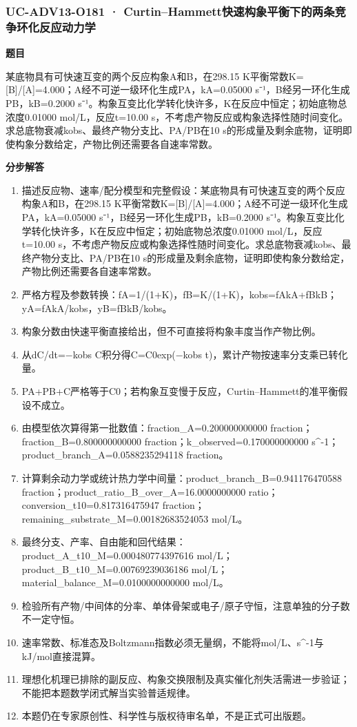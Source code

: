 \documentclass[UTF8,11pt,a4paper]{ctexart}
\begin{document}
\subsubsection*{UC-ADV13-O181 · Curtin–Hammett快速构象平衡下的两条竞争环化反应动力学}
\noindent\textbf{题目}\par
某底物具有可快速互变的两个反应构象A和B，在298.15 K平衡常数K=[B]/[A]=4.000；A经不可逆一级环化生成PA，kA=0.05000 s⁻¹，B经另一环化生成PB，kB=0.2000 s⁻¹。构象互变比化学转化快许多，K在反应中恒定；初始底物总浓度0.01000 mol/L，反应t=10.00 s，不考虑产物反应或构象选择性随时间变化。求总底物衰减kobs、最终产物分支比、PA/PB在10 s的形成量及剩余底物，证明即使构象分数给定，产物比例还需要各自速率常数。\par
\medskip\noindent\textbf{分步解答}
\begin{enumerate}
\item 描述反应物、速率/配分模型和完整假设：某底物具有可快速互变的两个反应构象A和B，在298.15 K平衡常数K=[B]/[A]=4.000；A经不可逆一级环化生成PA，kA=0.05000 s⁻¹，B经另一环化生成PB，kB=0.2000 s⁻¹。构象互变比化学转化快许多，K在反应中恒定；初始底物总浓度0.01000 mol/L，反应t=10.00 s，不考虑产物反应或构象选择性随时间变化。求总底物衰减kobs、最终产物分支比、PA/PB在10 s的形成量及剩余底物，证明即使构象分数给定，产物比例还需要各自速率常数。
\item 严格方程及参数转换：fA=1/(1+K)，fB=K/(1+K)，kobs=fAkA+fBkB；yA=fAkA/kobs，yB=fBkB/kobs。
\item 构象分数由快速平衡直接给出，但不可直接将构象丰度当作产物比例。
\item 从dC/dt=−kobs C积分得C=C0exp(−kobs t)，累计产物按速率分支乘已转化量。
\item PA+PB+C严格等于C0；若构象互变慢于反应，Curtin–Hammett的准平衡假设不成立。
\item 由模型依次算得第一批数值：fraction\_A=0.200000000000 fraction；fraction\_B=0.800000000000 fraction；k\_observed=0.170000000000 s\textasciicircum{}-1；product\_branch\_A=0.0588235294118 fraction。
\item 计算剩余动力学或统计热力学中间量：product\_branch\_B=0.941176470588 fraction；product\_ratio\_B\_over\_A=16.0000000000 ratio；conversion\_t10=0.817316475947 fraction；remaining\_substrate\_M=0.00182683524053 mol/L。
\item 最终分支、产率、自由能和回代结果：product\_A\_t10\_M=0.000480774397616 mol/L；product\_B\_t10\_M=0.00769239036186 mol/L；material\_balance\_M=0.0100000000000 mol/L。
\item 检验所有产物/中间体的分率、单体骨架或电子/原子守恒，注意单独的分子数不一定守恒。
\item 速率常数、标准态及Boltzmann指数必须无量纲，不能将mol/L、s\textasciicircum{}-1与kJ/mol直接混算。
\item 理想化机理已排除的副反应、构象交换限制及真实催化剂失活需进一步验证；不能把本题数学闭式解当实验普适规律。
\item 本题仍在专家原创性、科学性与版权待审名单，不是正式可出版题。
\end{enumerate}
\end{document}
